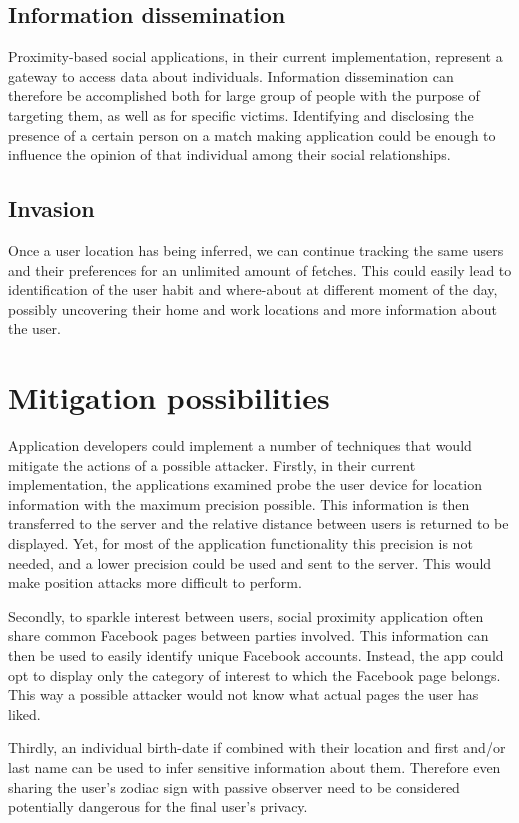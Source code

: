 \subsection{Information dissemination}
\noindent
Proximity-based social applications, in their current implementation, represent a gateway to access data about individuals. Information dissemination can therefore be accomplished both for large group of people with the purpose of targeting them, as well as for specific victims.
Identifying and disclosing the presence of a certain person on a match making application could be enough to influence the opinion of that individual among their social relationships.

\subsection{Invasion}
Once a user location has being inferred, we can continue tracking the same users and their preferences for an unlimited amount of fetches. This could easily lead to identification of the user habit and where-about at different moment of the day, possibly uncovering their home and work locations and more information about the user.

\section{Mitigation possibilities}
\noindent
Application developers could implement a number of techniques that would mitigate the actions of a possible attacker. Firstly, in their current implementation, the applications examined probe the user device for location information with the maximum precision possible. This information is then transferred to the server and the relative distance between users is returned to be displayed. Yet, for most of the application functionality this precision is not needed, and a lower precision could be used and sent to the server. This would make position attacks more difficult to perform.

Secondly, to sparkle interest between users, social proximity application often share common Facebook pages between parties involved. This information can then be used to easily identify unique Facebook accounts. Instead, the app could opt to display only the category of interest to which the Facebook page belongs. This way a possible attacker would not know what actual pages the user has liked.

Thirdly, an individual birth-date if combined with their location and first and/or last name can be used to infer sensitive information about them. Therefore even sharing the user's zodiac sign with passive observer need to be considered potentially dangerous for the final user's privacy.

